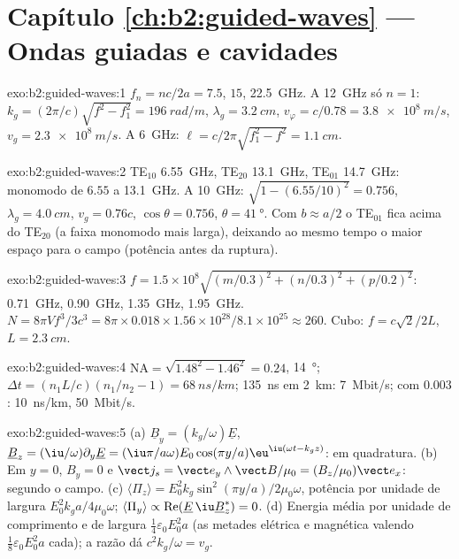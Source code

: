 \section*{Capítulo \ref{ch:b2:guided-waves} --- Ondas guiadas e cavidades}

\begin{solution}{exo:b2:guided-waves:1}
$f_n = nc/2a = 7.5$, $15$, \qty{22.5}{GHz}. A \qty{12}{GHz} só $n = 1$: $k_g =
(2\pi/c)\sqrt{f^2 - f_1^2} = \qty{196}{rad/m}$, $\lambda_g = \qty{3.2}{cm}$, $v_\varphi = c/0.78
= \qty{3.8e8}{m/s}$, $v_g = \qty{2.3e8}{m/s}$. A \qty{6}{GHz}: $\ell = c/2\pi\sqrt{f_1^2 -
f^2} = \qty{1.1}{cm}$.
\end{solution}

\begin{solution}{exo:b2:guided-waves:2}
TE$_{10}$ \qty{6.55}{GHz}, TE$_{20}$ \qty{13.1}{GHz}, TE$_{01}$ \qty{14.7}{GHz}: monomodo
de $6.55$ a \qty{13.1}{GHz}. A \qty{10}{GHz}: $\sqrt{1 - (6.55/10)^2} =
0.756$, $\lambda_g = \qty{4.0}{cm}$, $v_g = 0.76c$, $\cos\theta = 0.756$, $\theta = \qty{41}{\degree}$.
Com $b \approx a/2$ o TE$_{01}$ fica acima do TE$_{20}$ (a faixa monomodo mais larga),
deixando ao mesmo tempo o maior espaço para o campo (potência antes da ruptura).
\end{solution}

\begin{solution}{exo:b2:guided-waves:3}
$f = 1.5 \times 10^8\sqrt{(m/0.3)^2 + (n/0.3)^2 + (p/0.2)^2}$: \qty{0.71}{GHz}, \qty{0.90}{GHz},
\qty{1.35}{GHz}, \qty{1.95}{GHz}. $N = 8\pi Vf^3/3c^3 = 8\pi \times 0.018 \times 1.56 \times 10^{28}/
8.1 \times 10^{25} \approx 260$. Cubo: $f = c\sqrt2/2L$, $L = \qty{2.3}{cm}$.
\end{solution}

\begin{solution}{exo:b2:guided-waves:4}
$\mathrm{NA} = \sqrt{1.48^2 - 1.46^2} = 0.24$, \qty{14}{\degree}; $\Delta t = (n_1L/c)(n_1/n_2
- 1) = \qty{68}{ns/km}$; \qty{135}{ns} em \qty{2}{km}: \qty{7}{Mbit/s}; com $0.003$:
\qty{10}{ns/km}, \qty{50}{Mbit/s}.
\end{solution}

\begin{solution}{exo:b2:guided-waves:5}
(a) $\underline B_y = (k_g/\omega)\underline E$, $\underline B_z = (\iu/\omega)\partial_y\underline E = (\iu\pi/a\omega)
E_0\cos(\pi y/a)\eu^{\iu(\omega t - k_gz)}$: em quadratura. (b) Em $y = 0$, $B_y = 0$ e
$\vect j_s = \vect e_y\wedge\vect B/\mu_0 = (B_z/\mu_0)\vect e_x$: segundo o campo. (c)
$\langle\Pi_z\rangle = E_0^2k_g\sin^2(\pi y/a)/2\mu_0\omega$, potência por unidade de largura
$E_0^2k_ga/4\mu_0\omega$; $\langle\Pi_y\rangle \propto \operatorname{Re}(\underline E\,\iu\underline B_z^*)
= 0$. (d) Energia média por unidade de comprimento e de largura $\tfrac14\varepsilon_0E_0^2a$ (as metades
elétrica e magnética valendo $\tfrac18\varepsilon_0E_0^2a$ cada); a razão dá $c^2k_g/\omega = v_g$.
\end{solution}

